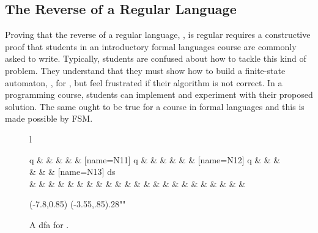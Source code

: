 \documentclass{eptcs}
\begin{document}
\subsection{The Reverse of a Regular Language}
Proving that the reverse of a regular language, , is regular requires a constructive proof that students in an introductory formal languages course are commonly asked to write. Typically, students are confused about how to tackle this kind of problem. They understand that they must show how to build a finite-state automaton, , for , but feel frustrated if their algorithm is not correct. In a programming course, students can implement and experiment with their proposed solution. The same ought to be true for a course in formal languages and this is made possible by \textsf{FSM}.

\newcommand{\reverse}{
\begin{psmatrix}[rowsep=.5cm,colsep=.2cm,mnode=circle,fillstyle=solid,fillcolor=LightBlue]
             [name=N10] q & & & & &  [name=N11] q  & & & & & &  [name=N12] q & & & & & &  [name=N13] ds \\
             & & & & & & & & & & & & & & & & & & & & & & &
\end{psmatrix}

}
\begin{figure}[t]
\begin{center}
\begin{tabular}{l}
  \reverse
  \rput(-7.8,0.85){\psframebox*[framearc=.1]{}}
  \cnode(-3.55,.85){.28}{""}

\end{tabular}
\caption{A \textsf{dfa} for .}
\label{Ldfsa}
\end{center}
\end{figure}

\newcommand{\reversec}{
\begin{psmatrix}[rowsep=.7cm,colsep=.2cm,mnode=circle,fillstyle=solid,fillcolor=LightBlue]
             & & & & [name=N14]  \\
             & & & & [name=N18] q & & & & &  [name=N17] q  & & & & & &  [name=N15] q & & & & [name=N16] ds \\
             & & & & & & & & & & & & & & & & & & & & & & &
\end{psmatrix}

\psset{arrows=->,linecolor=black,arcangle=30,arrowsize=4pt
2,labelsep=2pt}}
\end{document}
